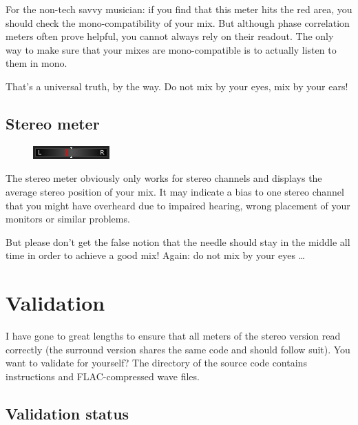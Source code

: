 For the non-tech savvy musician: if you find that this meter hits the
red area, you should check the mono-compatibility of your mix.  But
although phase correlation meters often prove helpful, you cannot
always rely on their readout.  The only way to make sure that your
mixes are mono-compatible is to actually listen to them in mono.

That's a universal truth, by the way.  Do not mix by your eyes, mix by
your ears!

\section{Stereo meter}

\begin{figure}
  \includegraphics[scale=\screenshotscale,clip]{include/images/stereo_meter.png}
\end{figure}

The stereo meter obviously only works for stereo channels and displays
the average stereo position of your mix.  It may indicate a bias to
one stereo channel that you might have overheard due to impaired
hearing, wrong placement of your monitors or similar problems.

But please don't get the false notion that the needle should stay in
the middle all time in order to achieve a good mix!  Again: do not mix
by your eyes \dots

\chapter{Validation}

I have gone to great lengths to ensure that all meters of the stereo
version read correctly (the surround version shares the same code and
should follow suit).  You want to validate for yourself?  The
directory  of the source code contains instructions
and FLAC-compressed wave files.

\section{Validation status}

